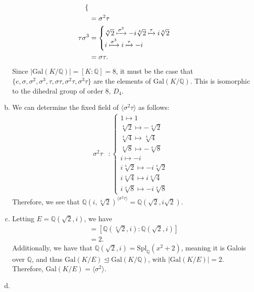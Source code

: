 \documentclass[10pt]{extarticle}
\newcommand{\Q}{\mathbb{Q}}
\begin{document}
\begin{enumerate}[(a)]
\begin{align*}
\begin{cases}
              \end{cases}\\
                           &= \sigma^2\tau\\
                \tau\sigma^3 &= \begin{cases}
                  \sqrt[4]{2} \xmapsto{\sigma^3}-i\sqrt[4]{2}\xmapsto{\tau}i\sqrt[4]{2}\\
                  i \xmapsto{\sigma^3}i\xmapsto{\tau}-i
                \end{cases}\\
                             &= \sigma\tau.
      \end{align*}
      Since $|\text{Gal}(K/\Q)| = [K:\Q] = 8$, it must be the case that $\{e,\sigma,\sigma^2,\sigma^3,\tau,\sigma\tau,\sigma^2\tau,\sigma^3\tau\}$ are the elements of $\text{Gal}(K/\Q)$. This is isomorphic to the dihedral group of order 8, $D_4$.
    \item We can determine the fixed field of $\langle \sigma^2\tau\rangle$ as follows:
        \begin{align*}
          \sigma^2\tau &: \begin{cases}
            1 \mapsto 1\\
            \sqrt[4]{2} \mapsto -\sqrt[4]{2}\\
            \sqrt[4]{4} \mapsto \sqrt[4]{4}\\
            \sqrt[4]{8} \mapsto -\sqrt[4]{8}\\
            i\mapsto -i\\
            i\sqrt[4]{2} \mapsto -i\sqrt[4]{2}\\
            i\sqrt[4]{4} \mapsto i\sqrt[4]{4}\\
            i\sqrt[4]{8} \mapsto -i\sqrt[4]{8}
          \end{cases}
        \end{align*}
        Therefore, we see that $\Q(i,\sqrt[4]{2})^{\langle \sigma^2\tau\rangle} = \Q(\sqrt{2},i\sqrt{2})$. 
      \item Letting $E = \Q(\sqrt{2},i)$, we have
        \begin{align*}
          [K:E] &= [\Q(\sqrt[4]{2},i):\Q(\sqrt{2},i)]\\
                &= 2.
        \end{align*}
        Additionally, we have that $\Q(\sqrt{2},i) = \text{Spl}_{\Q}(x^2 + 2)$, meaning it is Galois over $\Q$, and thus $\text{Gal}(K/E) \trianglelefteq \text{Gal}(K/\Q)$, with $|\text{Gal}(K/E)| = 2$. Therefore, $\text{Gal}(K/E) = \langle \sigma^2\rangle$.
      \item 
  \end{enumerate}
\end{document}
